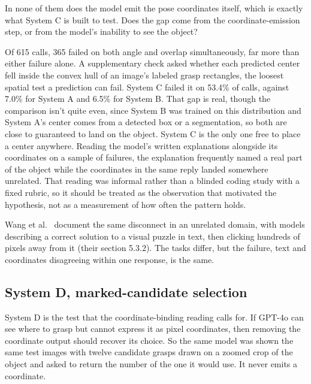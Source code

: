 \documentclass[12pt,letterpaper]{article}
\begin{document}
In none of them does the model emit the pose coordinates itself, which
is exactly what System C is built to test. Does the gap come from the
coordinate-emission step, or from the model's inability to see the
object?

Of 615 calls, 365 failed on both angle and overlap simultaneously, far
more than either failure alone. A supplementary check asked whether
each predicted center fell inside the convex hull of an image's labeled
grasp rectangles, the loosest spatial test a prediction can fail.
System C failed it on 53.4\% of calls, against 7.0\% for System A and
6.5\% for System B. That gap is real, though the comparison isn't quite
even, since System B was trained on this distribution and System A's
center comes from a detected box or a segmentation, so both are close
to guaranteed to land on the object. System C is the only one free to
place a center anywhere. Reading the model's written explanations
alongside its coordinates on a sample of failures, the explanation
frequently named a real part of the object while the coordinates in the
same reply landed somewhere unrelated. That reading was informal rather
than a blinded coding study with a fixed rubric, so it should be
treated as the observation that motivated the hypothesis, not as a
measurement of how often the pattern holds.

Wang et al.~\cite{wang2025} document the same disconnect in an unrelated domain, with
models describing a correct solution to a visual puzzle in text, then
clicking hundreds of pixels away from it (their section 5.3.2). The
tasks differ, but the failure, text and coordinates disagreeing within
one response, is the same.

\subsection{System D, marked-candidate selection}

System D is the test that the coordinate-binding reading calls for. If
GPT-4o can see where to grasp but cannot express it as pixel
coordinates, then removing the coordinate output should recover its
choice. So the same model was shown the same test images with twelve
candidate grasps drawn on a zoomed crop of the object and asked to
return the number of the one it would use. It never emits a coordinate.
\end{document}
